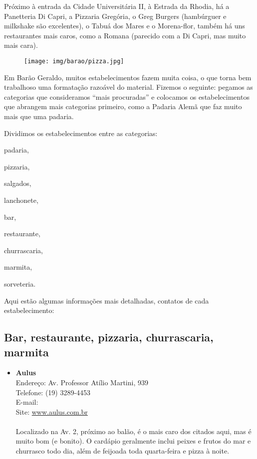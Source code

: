 Próximo à entrada da Cidade Universitária II, à Estrada da Rhodia, há a
Panetteria Di Capri, a Pizzaria Gregória, o Greg Burgers (hambúrguer e
milkshake são excelentes), o Tabuá dos Mares e o Morena-flor, também há uns
restaurantes mais caros, como a Romana (parecido com a Di Capri, mas muito mais
cara).\\

\begin{figure}[h!]
  \centering
  \texttt{[image: img/barao/pizza.jpg]}
\end{figure}

Em Barão Geraldo, muitos estabelecimentos fazem muita coisa, o que torna bem
trabalhoso uma formatação razoável do material. Fizemos o seguinte: pegamos as
categorias que consideramos ``mais procuradas'' e colocamos os estabelecimentos
que abrangem mais categorias primeiro, como a Padaria Alemã que faz muito mais
que uma padaria.

Dividimos os estabelecimentos entre as categorias:

\begin{compactitemize}
\begin{multicols}{2}
\item padaria,
\item pizzaria,
\item salgados,
\item lanchonete,
\item bar,
\item restaurante,
\item churrascaria,
\item marmita,
\item sorveteria.
\end{multicols}
\end{compactitemize}

Aqui estão algumas informações mais detalhadas, contatos de cada
estabelecimento:

\subsection{Bar, restaurante, pizzaria, churrascaria, marmita}

\begin{itemize}
\item \textbf{Aulus}
  \\Endereço: Av. Professor Atílio Martini, 939
  \\Telefone: (19) 3289-4453
  \\E-mail: 
  \\Site: \url{www.aulus.com.br}
  \\
  \\Localizado na Av. 2, próximo ao balão, é o mais caro dos citados aqui, mas
  é muito bom (e bonito). O cardápio geralmente inclui peixes e frutos do mar e
  churrasco todo dia, além de feijoada toda quarta-feira e pizza à noite.
\end{itemize}

